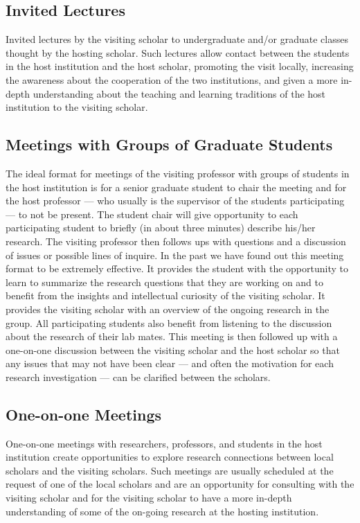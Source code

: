 \documentclass[10pt]{article}
\begin{document}
\subsection{Invited Lectures}

Invited lectures by the visiting scholar to undergraduate and/or graduate classes thought by the hosting scholar. Such lectures allow contact between the students in the host institution and the host scholar, promoting the visit locally, increasing the awareness about the cooperation of the two institutions, and given a more in-depth understanding about the teaching and learning traditions of the host institution to the visiting scholar.

\subsection{Meetings with Groups of Graduate Students}

The ideal format for meetings of the visiting professor with groups of students in the host institution is for a senior graduate student to chair the meeting and for the host professor --- who usually is the supervisor of the students participating --- to not be present. The student chair will give opportunity to each participating student to briefly (in about three minutes) describe his/her research. The visiting professor then follows ups with questions and a discussion of issues or possible lines of inquire. In the past we have found out this meeting format to be extremely effective. It provides the student with the opportunity to learn to summarize the research questions that they are working on and to benefit from the insights and intellectual curiosity of the visiting scholar. It provides the visiting scholar with an overview of the ongoing research in the group. All participating students also benefit from listening to the discussion about the research of their lab mates. This meeting is then followed up with a one-on-one discussion between the visiting scholar and the host scholar so that any issues that may not have been clear --- and often the motivation for each research investigation --- can be clarified between the scholars.

\subsection{One-on-one Meetings}

One-on-one meetings with researchers, professors, and students in the host institution create opportunities to explore research connections between local scholars and the visiting scholars. Such meetings are usually scheduled at the request of one of the local scholars and are an opportunity for consulting with the visiting scholar and for the visiting scholar to have a more in-depth understanding of some of the on-going research at the hosting institution.


\end{document}
